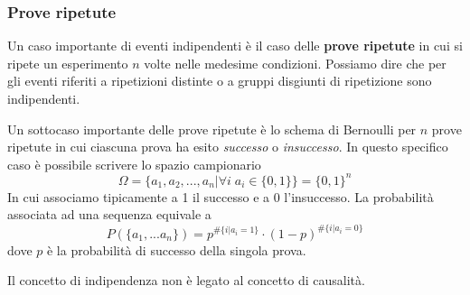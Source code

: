 \subsubsection{Prove ripetute}
Un caso importante di eventi indipendenti è il caso delle \textbf{prove ripetute} in cui si ripete
un esperimento $n$ volte nelle medesime condizioni. Possiamo dire che per gli eventi riferiti a
ripetizioni distinte o a gruppi disgiunti di ripetizione sono indipendenti.

Un sottocaso importante delle prove ripetute è lo schema di Bernoulli per $n$ prove ripetute in
cui ciascuna prova ha esito \emph{successo} o \emph{insuccesso}. In questo specifico caso è
possibile scrivere lo spazio campionario
\[ \Omega = \{ a_1, a_2, ..., a_n | \forall i \; a_i \in \{ 0, 1 \} \} = \{ 0, 1 \}^n \]
In cui associamo tipicamente a 1 il successo e a 0 l'insuccesso. La probabilità associata ad una
sequenza equivale a
\[ P(\{ a_1, ... a_n \}) = p^{\# \{i | a_i = 1\}} \cdot (1 - p)^{\# \{i | a_i = 0\}}  \]
dove $p$ è la probabilità di successo della singola prova.

\begin{observation}
	Il concetto di indipendenza non è legato al concetto di causalità.
\end{observation}
